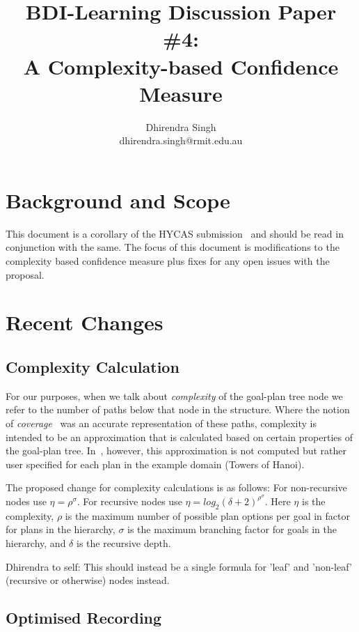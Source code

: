 \documentclass[a4paper]{article}
\title{BDI-Learning Discussion Paper \#4:\\A Complexity-based Confidence Measure}
\author{
Dhirendra Singh\\ 
dhirendra.singh@rmit.edu.au\\
}
\begin{document}

\maketitle

\section{Background and Scope}

This document is a corollary of the HYCAS submission~\cite{Singh:HYCAS10} and should be read in conjunction with the same. The focus of this document is modifications to the complexity based confidence measure plus fixes for any open issues with the proposal.

\section{Recent Changes}

\subsection{Complexity Calculation}

For our purposes, when we talk about \textit{complexity} of the goal-plan tree node we refer to the number of paths below that node in the structure. Where the notion of \textit{coverage}~\cite{Singh:AAMAS10} was an accurate representation of these paths, complexity is intended to be an approximation that is calculated based on certain properties of the goal-plan tree. In~\cite{Singh:HYCAS10}, however, this approximation is not computed but rather user specified for each plan in the example domain (Towers of Hanoi). 

The proposed change for complexity calculations is as follows: For non-recursive nodes use $\eta = \rho ^ \sigma$. For recursive nodes use $\eta = log_2(\delta+2) ^ {\rho ^ \sigma}$. Here $\eta$ is the complexity, $\rho$ is the maximum number of possible plan options per goal in factor for plans in the hierarchy, $\sigma$ is the maximum branching factor for goals in the hierarchy, and $\delta$ is the recursive depth.

Dhirendra to self: This should instead be a single formula for 'leaf' and  'non-leaf' (recursive or otherwise) nodes instead.

\subsection{Optimised Recording}
\end{document}
